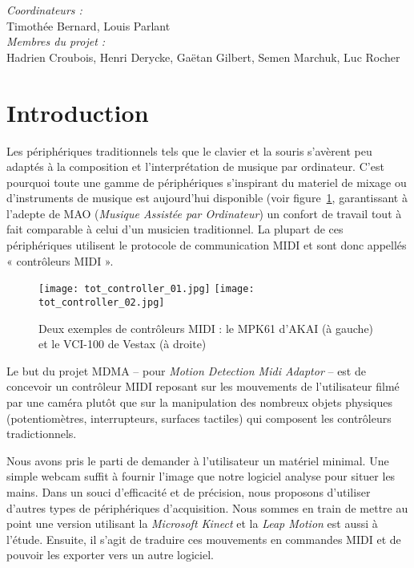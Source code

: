 
\usepackage{pdfpages}


\begin{center}
    \emph{Coordinateurs :}\\
    Timothée Bernard, Louis Parlant\bigskip\\
    \emph{Membres du projet :}\\
    Hadrien Croubois, Henri Derycke, Gaëtan Gilbert, Semen Marchuk, Luc Rocher
\end{center}
\newpage
\tableofcontents
\newpage
\section{Introduction}
\par Les périphériques traditionnels tels que le clavier et la souris s'avèrent peu adaptés à la composition et l'interprétation de musique par ordinateur. C'est pourquoi toute une gamme de périphériques s'inspirant du materiel de mixage ou d'instruments de musique est aujourd'hui disponible (voir figure~\ref{MIDI_controllers}, garantissant à l'adepte de MAO (\emph{Musique Assistée par Ordinateur}) un confort de travail tout à fait comparable à celui d'un musicien traditionnel. La plupart de ces périphériques utilisent le protocole de communication MIDI et sont donc appellés « contrôleurs MIDI ».
\begin{figure}[h]
    \centering
    \texttt{[image: tot\_controller\_01.jpg]}
    \texttt{[image: tot\_controller\_02.jpg]}
    \caption{Deux exemples de contrôleurs MIDI : le MPK61 d'AKAI (à gauche) et le VCI-100 de Vestax (à droite)}
    \label{MIDI_controllers}
\end{figure}
\par Le but du projet MDMA  – pour \emph{Motion Detection Midi Adaptor}  – est de concevoir un contrôleur MIDI reposant sur les mouvements de l'utilisateur filmé par une caméra plutôt que sur la manipulation des nombreux objets physiques (potentiomètres, interrupteurs, surfaces tactiles) qui composent les contrôleurs tradictionnels.
\par Nous avons pris le parti de demander à l'utilisateur un matériel minimal. Une simple webcam suffit à fournir l'image que notre logiciel analyse pour situer les mains. Dans un souci d'efficacité et de précision, nous proposons d'utiliser d'autres types de périphériques d'acquisition. Nous sommes en train de mettre au point une version utilisant la \emph{Microsoft Kinect} et la \emph{Leap Motion} est aussi à l'étude. Ensuite, il s'agit de traduire ces mouvements en commandes MIDI et de pouvoir les exporter vers un autre logiciel.

